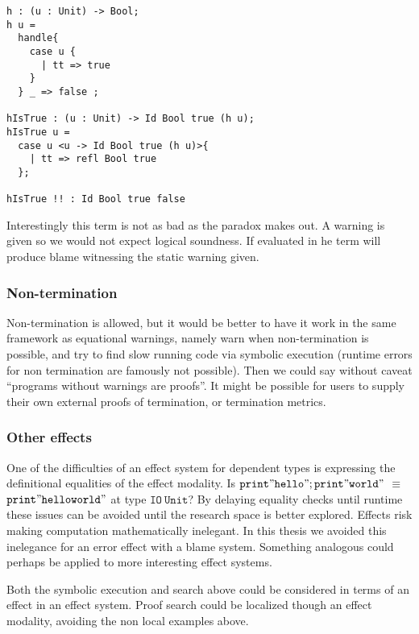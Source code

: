 \begin{lstlisting}
h : (u : Unit) -> Bool;
h u =
  handle{
    case u {
      | tt => true
    }
  } _ => false ;

hIsTrue : (u : Unit) -> Id Bool true (h u);
hIsTrue u =
  case u <u -> Id Bool true (h u)>{
    | tt => refl Bool true
  };

hIsTrue !! : Id Bool true false
\end{lstlisting}

Interestingly this term is not as bad as the paradox makes out.
A warning is given so we would not expect logical soundness.
If evaluated in \whnf{} he term will produce blame witnessing the static warning given.


\subsubsection{Non-termination}

Non-termination is allowed, but it would be better to have it work in the same framework as equational warnings, namely warn when non-termination is possible, and try to find slow running code via symbolic execution (runtime errors for non termination are famously not possible).
Then we could say without caveat ``programs without warnings are proofs''.
It might be possible for users to supply their own external proofs of termination\cite{casinghino2014combining}, or termination metrics.

\subsubsection{Other effects}

One of the difficulties of an effect system for dependent types is expressing the definitional equalities of the effect modality.
Is $\mathtt{print"hello";print"world"}$ $\equiv$ $\mathtt{print"helloworld"}$ at type $\mathtt{IO\ Unit}$?
By delaying equality checks until runtime these issues can be avoided until the research space is better explored.
Effects risk making computation mathematically inelegant.
In this thesis we avoided this inelegance for an error effect with a blame system.
Something analogous could perhaps be applied to more interesting effect systems.

Both the symbolic execution and search above could be considered in terms of an effect in an effect system.
Proof search could be localized though an effect modality, avoiding the non local examples above.

